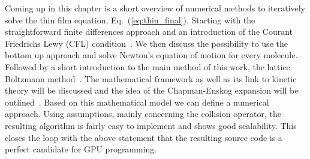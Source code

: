 Coming up in this chapter is a short overview of numerical methods to iteratively solve the thin film equation, Eq.~(\ref{eq:thin_final}).
Starting with the straightforward finite differences approach and an introduction of the Courant Friedrichs Lewy (CFL) condition~\cite{courantUeberPartiellenDifferenzengleichungen1928}.
We then discuss the possibility to use the bottom up approach and solve Newton's equation of motion for every molecule.
Followed by a short introduction to the main method of this work, the lattice Boltzmann method~\cite{frischLatticeGasAutomataNavierStokes1986, krugerLatticeBoltzmannMethod2017, succiLatticeBoltzmannEquation2001}. 
The mathematical framework as well as its link to kinetic theory will be discussed and the idea of the Chapman-Enskog expansion will be outlined~\cite{chapmanMathematicalTheoryNonuniform1990, enskogKinetischeTheorieVorgange1917}. 
Based on this mathematical model we can define a numerical approach.
Using assumptions, mainly concerning the collision operator, the resulting algorithm is fairly easy to implement and shows good scalability.
This closes the loop with the above statement that the resulting source code is a perfect candidate for GPU programming.

